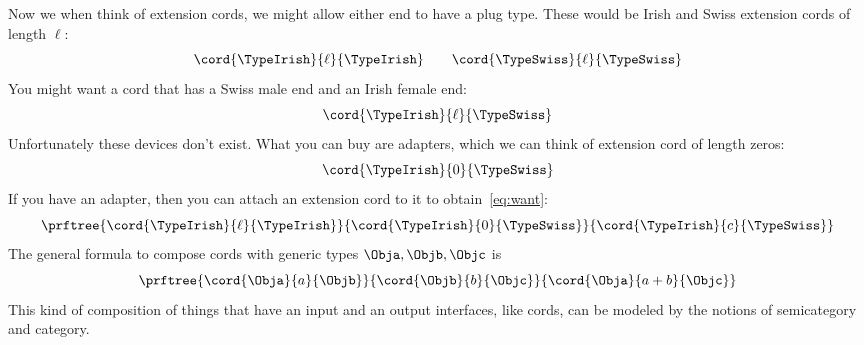 Now we when think of extension cords, we might allow either end to have a plug type.
%
These would be Irish and Swiss extension cords of length $\ell$:
%
\begin{equation}
    \cord{\TypeIrish}{\ell}{\TypeIrish} \qquad \cord{\TypeSwiss}{\ell}{\TypeSwiss}
\end{equation}
%
You might want a cord that has a Swiss male end and an Irish female end:
%
\begin{equation}
    \label{eq:want}
    \cord{\TypeIrish}{\ell}{\TypeSwiss}
\end{equation}
%
Unfortunately these devices don't exist.
What you can buy are adapters, which we can think of extension cord of length zeros:
\begin{equation}
    \cord{\TypeIrish}{0}{\TypeSwiss}
\end{equation}
%
If you have an adapter, then you can attach an extension cord to it to obtain~\cref{eq:want}:
%
\begin{equation}
    \label{eq:irish-swiss-result}
    \prftree{\cord{\TypeIrish}{\ell}{\TypeIrish}}{\cord{\TypeIrish}{0}{\TypeSwiss}}{\cord{\TypeIrish}{c}{\TypeSwiss}}
\end{equation}
%
The general formula to compose cords with generic types $\Obja, \Objb, \Objc$ is
%
\begin{equation}
    \label{eq:cords-generic}
    \prftree{\cord{\Obja}{a}{\Objb}}{\cord{\Objb}{b}{\Objc}}{\cord{\Obja}{a+b}{\Objc}}
\end{equation}
%
This kind of composition of things that have an input and an output interfaces, like cords, can be modeled by the notions of semicategory and category.


%

%
%
%


